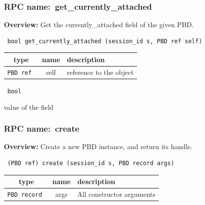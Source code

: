 \subsubsection{RPC name:~get\_currently\_attached}

{\bf Overview:} 
Get the currently\_attached field of the given PBD.

\begin{verbatim} bool get_currently_attached (session_id s, PBD ref self)\end{verbatim}



 
\vspace{0.3cm}
\begin{tabular}{|c|c|p{7cm}|}
 \hline
{\bf type} & {\bf name} & {\bf description} \\ \hline
{\tt PBD ref } & self & reference to the object \\ \hline 

\end{tabular}

\vspace{0.3cm}

{\tt 
bool
}


value of the field
\vspace{0.3cm}
\vspace{0.3cm}
\vspace{0.3cm}
\subsubsection{RPC name:~create}

{\bf Overview:} 
Create a new PBD instance, and return its handle.

\begin{verbatim} (PBD ref) create (session_id s, PBD record args)\end{verbatim}



 
\vspace{0.3cm}
\begin{tabular}{|c|c|p{7cm}|}
 \hline
{\bf type} & {\bf name} & {\bf description} \\ \hline
{\tt PBD record } & args & All constructor arguments \\ \hline 

\end{tabular}

